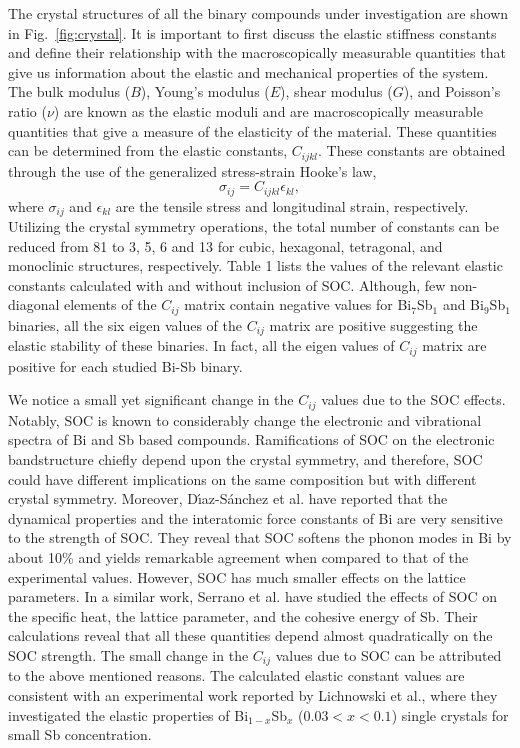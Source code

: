 \documentclass[twocolumn,superscriptaddress,nofootinbib,floatfix,aps,showpacs,prb,citeautoscript,reprint]{revtex4-1}
\begin{document}
The crystal structures of all the binary compounds under investigation are shown in Fig.~\ref{fig:crystal}. It is important to first discuss the elastic stiffness constants and define their relationship with the macroscopically measurable quantities that give us information about the elastic and mechanical properties of the system. The bulk modulus ($B$), Young's modulus ($E$), shear modulus ($G$), and Poisson's ratio ($\nu$) are known as the elastic moduli and are macroscopically measurable quantities that give a measure of the elasticity of the material. These quantities can be determined from the elastic constants, $C_{ijkl}$. These constants are obtained through the use of the generalized stress-strain Hooke's law\cite{nye1985physical},
\begin{equation}
\sigma_{ij}=C_{ijkl}\epsilon_{kl},
\end{equation}
where $\sigma_{ij}$ and $\epsilon_{kl}$ are the tensile stress and longitudinal strain, respectively. Utilizing the crystal symmetry operations, the total number of constants can be reduced from 81 to 3, 5, 6 and 13 for cubic, hexagonal, tetragonal, and monoclinic structures, respectively. \cite{nye1985physical} Table 1 lists the values of the relevant elastic constants calculated with and without inclusion of SOC. Although, few non-diagonal elements of the $C_{ij}$ matrix contain negative values for Bi$_{7}$Sb$_{1}$ and Bi$_{9}$Sb$_{1}$ binaries, all the six eigen values of the $C_{ij}$ matrix are positive suggesting the elastic stability of these binaries. In fact, all the eigen values of $C_{ij}$ matrix are positive for each studied Bi-Sb binary. 

We notice a small yet significant change in the $C_{ij}$ values due to the SOC effects. Notably, SOC is known to considerably change the electronic and vibrational spectra of Bi and Sb based compounds. Ramifications of SOC on the electronic bandstructure chiefly depend upon the crystal symmetry, and therefore, SOC could have different implications on the same composition but with different crystal symmetry. \cite{singh2016PCCP, BiSOC_PRB2007} Moreover, D\'{\i}az-S\'anchez et al.\cite{BiSOC_PRB2007} have reported that the dynamical properties and the interatomic force constants of Bi are very sensitive to the strength of SOC. They reveal that SOC softens the phonon modes in Bi by about 10\% and yields remarkable agreement when compared to that of the experimental values. However, SOC has much smaller effects on the lattice parameters. \cite{BiSOC_PRB2007} In a similar work, Serrano et al. \cite{SbSOC_PRB2008}  have studied the effects of SOC on the specific heat, the lattice parameter, and the cohesive energy of Sb. Their calculations reveal that all these quantities depend almost quadratically on the SOC strength. \cite{SbSOC_PRB2008} The small change in the $C_{ij}$ values due to SOC can be attributed to the above mentioned reasons. The calculated elastic constant values are consistent with an experimental work reported by Lichnowski et al.\cite{Lichnowski1976}, where they investigated the elastic properties of Bi$_{1-x}$Sb$_{x}$  ($0.03 < x < 0.1$) single crystals for small Sb concentration. 
\end{document}
